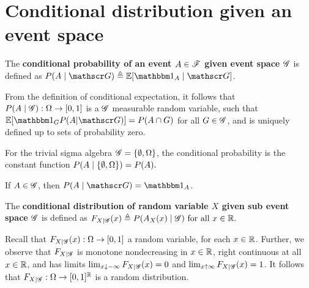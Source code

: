 \documentclass[letterpaper,10pt,english]{article}
\begin{document}
\section{Conditional distribution given an event space} 
\begin{defn}%
The \textbf{conditional probability %
of an event $A\in\mathscr{F}$ given event space $\mathscr{G}$} is 
defined as $P(A\mid \sG) \triangleq \E[\Ind{A}\mid\sG]$. 
\end{defn}
\begin{rem}
From the definition of conditional expectation, 
it follows that $P(A\mid \mathscr{G}):\Omega\to[0,1]$ is a $\mathscr{G}$ measurable random variable, such that 
$\E[\Ind{G}P(A|\sG)] = P(A\cap G)$ for all $G \in \mathscr{G}$, 
and is uniquely defined up to sets of probability zero. 
\end{rem}
\begin{shaded}
\begin{exmp} 
For the trivial sigma algebra   $\mathscr{G} =\left\{\emptyset ,\Omega\right\}$, 
the conditional probability is the constant function
$P(A\mid \left\{\emptyset ,\Omega\right\})=P (A).$
\end{exmp}
\begin{exmp} 
If $A\in \mathscr{G}$, then $P(A\mid\sG)=\Ind{A}$. 
\end{exmp}
\end{shaded}
\begin{defn}%
The \textbf{conditional distribution of random variable $X$ given sub event space $\mathscr{G}$} is defined as 
$
F_{X \mid \mathscr{G}}(x)\triangleq P(A_X(x)\mid \mathscr{G})\text{ for all }x \in \mathbb{R}.
$
\end{defn}
\begin{rem} 
Recall that $F_{X\mid\mathscr{G}}(x): \Omega\to[0,1]$ a random variable, for each $x\in\mathbb{R}$. 
Further, we observe that $F_{X\mid\mathscr{G}}$ is monotone nondecreasing in $x \in \mathbb{R}$,  right continuous at all $x\in\mathbb{R}$, and has limits $\lim_{x\downarrow-\infty}F_{X\mid\mathscr{G}}(x) = 0$ and $\lim_{x\uparrow\infty}F_{X\mid\mathscr{G}}(x) = 1$. 
It follows that $F_{X\mid\mathscr{G}}: \Omega \to [0,1]^{\mathbb{R}}$ is a random distribution. 
\end{rem}
\end{document}
